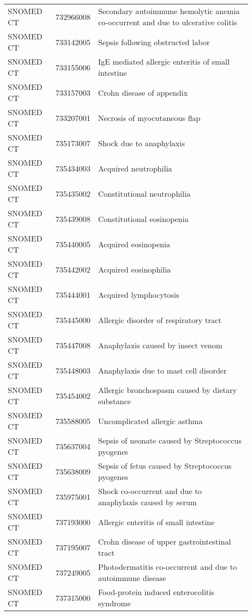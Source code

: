 \begin{longtable}{p{}p{}p{}}
  SNOMED CT & 732966008 & Secondary autoimmune hemolytic anemia co-occurrent and due to ulcerative colitis \\ 
  SNOMED CT & 733142005 & Sepsis following obstructed labor \\ 
  SNOMED CT & 733155006 & IgE mediated allergic enteritis of small intestine \\ 
  SNOMED CT & 733157003 & Crohn disease of appendix \\ 
  SNOMED CT & 733207001 & Necrosis of myocutaneous flap \\ 
  SNOMED CT & 735173007 & Shock due to anaphylaxis \\ 
  SNOMED CT & 735434003 & Acquired neutrophilia \\ 
  SNOMED CT & 735435002 & Constitutional neutrophilia \\ 
  SNOMED CT & 735439008 & Constitutional eosinopenia \\ 
  SNOMED CT & 735440005 & Acquired eosinopenia \\ 
  SNOMED CT & 735442002 & Acquired eosinophilia \\ 
  SNOMED CT & 735444001 & Acquired lymphocytosis \\ 
  SNOMED CT & 735445000 & Allergic disorder of respiratory tract \\ 
  SNOMED CT & 735447008 & Anaphylaxis caused by insect venom \\ 
  SNOMED CT & 735448003 & Anaphylaxis due to mast cell disorder \\ 
  SNOMED CT & 735454002 & Allergic bronchospasm caused by dietary substance \\ 
  SNOMED CT & 735588005 & Uncomplicated allergic asthma \\ 
  SNOMED CT & 735637004 & Sepsis of neonate caused by Streptococcus pyogenes \\ 
  SNOMED CT & 735638009 & Sepsis of fetus caused by Streptococcus pyogenes \\ 
  SNOMED CT & 735975001 & Shock co-occurrent and due to anaphylaxis caused by serum \\ 
  SNOMED CT & 737193000 & Allergic enteritis of small intestine \\ 
  SNOMED CT & 737195007 & Crohn disease of upper gastrointestinal tract \\ 
  SNOMED CT & 737249005 & Photodermatitis co-occurrent and due to autoimmune disease \\ 
  SNOMED CT & 737315000 & Food-protein induced enterocolitis syndrome \\ 

\end{longtable}
